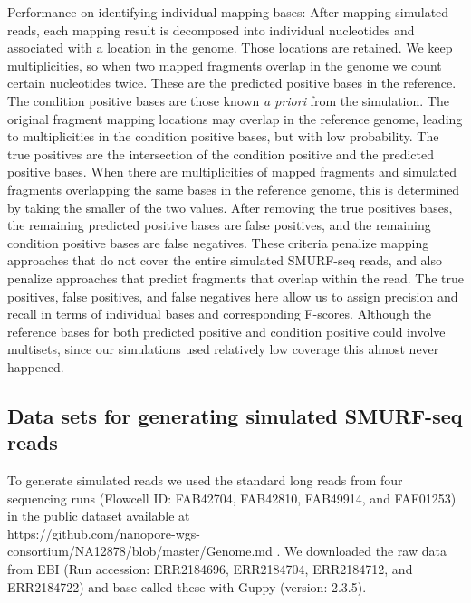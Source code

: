 Performance on identifying individual mapping bases: After mapping
simulated reads, each mapping result is decomposed into individual
nucleotides and associated with a location in the genome. Those
locations are retained. We keep multiplicities, so when two mapped
fragments overlap in the genome we count certain nucleotides twice.
These are the predicted positive bases in the reference.  The condition
positive bases are those known \textit{a priori} from the simulation.
The original fragment mapping locations may overlap in the reference
genome, leading to multiplicities in the condition positive bases, but
with low probability. The true positives are the intersection of the
condition positive and the predicted positive bases. When there are
multiplicities of mapped fragments and simulated fragments overlapping
the same bases in the reference genome, this is determined by taking the
smaller of the two values. After removing the true positives bases, the
remaining predicted positive bases are false positives, and the
remaining condition positive bases are false negatives. These criteria
penalize mapping approaches that do not cover the entire simulated
SMURF-seq reads, and also penalize approaches that predict fragments
that overlap within the read. The true positives, false positives, and
false negatives here allow us to assign precision and recall in terms of
individual bases and corresponding F-scores. Although the reference
bases for both predicted positive and condition positive could involve
multisets, since our simulations used relatively low coverage this
almost never happened.


\subsection{Data sets for generating simulated SMURF-seq reads}
To generate simulated reads we used the standard long reads from four
sequencing runs (Flowcell ID: FAB42704, FAB42810, FAB49914, and
FAF01253) in the public dataset available at \\
https://github.com/nanopore-wgs-consortium/NA12878/blob/master/Genome.md
\cite{jain2018nanopore,jain2018nanopore_git}. We downloaded the raw data
from EBI (Run accession: ERR2184696, ERR2184704, ERR2184712, and
ERR2184722) and base-called these with Guppy (version: 2.3.5).


